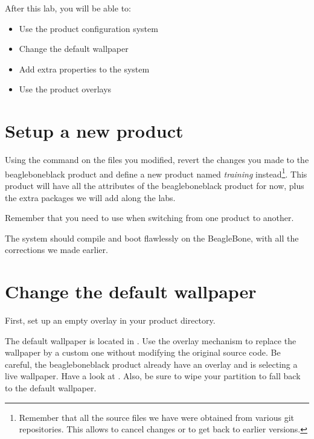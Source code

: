 
After this lab, you will be able to:
\begin{itemize}
  \item Use the product configuration system
  \item Change the default wallpaper
  \item Add extra properties to the system
  \item Use the product overlays
\end{itemize}

\section{Setup a new product}

Using the  command on the files you modified,
revert the changes you made to the beagleboneblack product and define
a new product named \textit{training} instead\footnote{Remember that
  all the source files we have were obtained from various git
  repositories. This allows to cancel changes or to get back to
  earlier versions.}.  This product will have all the attributes of
the beagleboneblack product for now, plus the extra packages we will
add along the labs.

Remember that you need to use  when switching
from one product to another.

The system should compile and boot flawlessly on the BeagleBone, with
all the corrections we made earlier.

\section{Change the default wallpaper}

First, set up an empty overlay in your product directory.

The default wallpaper is located in .
Use the overlay mechanism to replace the wallpaper by a custom one without
modifying the original source code. Be careful, the beagleboneblack
product already have an overlay and is selecting a live wallpaper.
Have a look at .
Also, be sure to wipe your  partition to fall back to the
default wallpaper.
